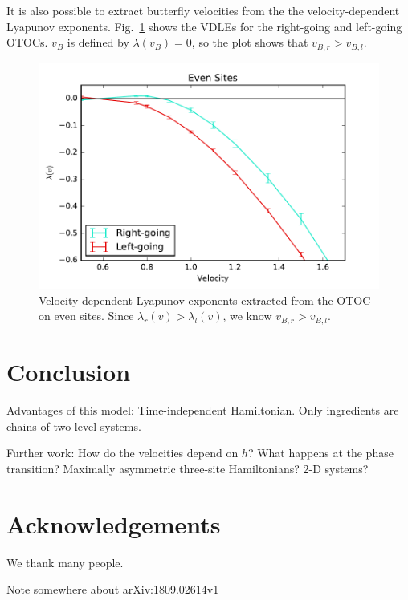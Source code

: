 \documentclass[aps,prl,reprint,superscriptaddress, longbibliography]{revtex4-1}
\newcommand{\charlie}[1]{ {\color{Magenta} {{#1}}}}
\begin{document}
It is also possible to extract butterfly velocities from the the velocity-dependent Lyapunov exponents. Fig.~\ref{fig:vdle} shows the VDLEs for the right-going and left-going OTOCs. $v_B$ is defined by $\lambda(v_B) = 0$, so the plot shows that $v_{B,r}>v_{B,l}$.

\begin{figure}
	\includegraphics[width=\columnwidth]{vdle}
	\caption{Velocity-dependent Lyapunov exponents extracted from the OTOC on even sites. Since $\lambda_r(v)>\lambda_l(v)$, we know $v_{B,r}>v_{B,l}$.}
	\label{fig:vdle}
\end{figure}

\section{Conclusion}

Advantages of this model:
Time-independent Hamiltonian.
Only ingredients are chains of two-level systems.

Further work:
How do the velocities depend on $h$?
What happens at the phase transition?
Maximally asymmetric three-site Hamiltonians?
2-D systems?


\section*{Acknowledgements}
We thank many people.

\charlie{Note somewhere about arXiv:1809.02614v1}



\begin{appendix}


\end{appendix}
\end{document}
